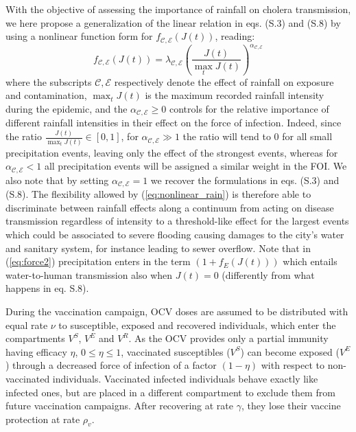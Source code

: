With the objective of assessing the importance of rainfall on cholera transmission, we here propose a generalization of the linear relation in eqs. (S.3) and (S.8) by using a nonlinear function form for  $f_{\mathcal{C,E}}\left(J(t)\right)$, reading: %
\begin{equation}
    f_{\mathcal{C,E}}\left(J(t)\right)=\lambda_{\mathcal{C,E}} \left(\frac{J(t)}{\max_t J(t)}\right)^{\alpha_{\mathcal{C,E}}}
    \label{eq:nonlinear_rain}
\end{equation}
where the subscripts $\mathcal{C,E}$ respectively denote the effect of rainfall on exposure and contamination, $\max_t J(t)$ is the maximum recorded rainfall intensity during the epidemic, and the $\alpha_{\mathcal{C,E}}\ge0$ controls for the relative importance of different rainfall intensities in their effect on the force of infection. Indeed, since the ratio $\frac{J(t)}{\max_t J(t)} \in [0,1]$, for $\alpha_{\mathcal{C,E}} \gg 1$ the ratio will tend to 0 for all small precipitation events, leaving only the effect of the strongest events, whereas for $\alpha_{\mathcal{C,E}} < 1$ all precipitation events will be assigned a similar weight in the FOI. We also note that by setting $\alpha_{\mathcal{C,E}} = 1$ we recover the formulations in eqs. (S.3) and (S.8). The flexibility allowed by (\ref{eq:nonlinear_rain}) is therefore able to discriminate between rainfall effects along a continuum from acting on disease transmission regardless of intensity to a threshold-like effect for the largest events which could be associated to severe flooding causing damages to the city's water and sanitary system, for instance leading to sewer overflow.
Note that in (\ref{eq:force2}) precipitation enters in the term $\left(1+f_E \left(J(t)\right)\right)$ which entails water-to-human transmission also when $J(t)=0$ (differently from what happens in eq. S.8).

During the vaccination campaign, OCV doses are assumed to be distributed with equal rate $\nu$ to susceptible, exposed and recovered individuals, which enter the compartments $V^S$, $V^E$ and $V^R$. As the OCV provides only a partial immunity having efficacy $\eta$, $0\leq \eta \leq 1$, vaccinated susceptibles ($V^S$) can become exposed ($V^E$) through a decreased force of infection of a factor $(1-\eta)$ with respect to non-vaccinated individuals. Vaccinated infected individuals behave exactly like infected ones, but are placed in a different compartment to exclude them from future vaccination campaigns. After recovering at  rate $\gamma$, they lose their vaccine protection at rate $\rho_{v}$.


